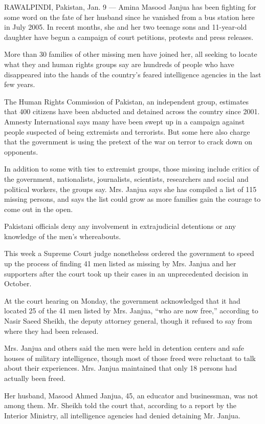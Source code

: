 RAWALPINDI, Pakistan, Jan. 9 --- Amina Masood Janjua has been fighting
for some word on the fate of her husband since he vanished from a bus
station here in July 2005. In recent months, she and her two teenage
sons and 11-year-old daughter have begun a campaign of court petitions,
protests and press releases.

More than 30 families of other missing men have joined her, all seeking
to locate what they and human rights groups say are hundreds of people
who have disappeared into the hands of the country's feared intelligence
agencies in the last few years.

The Human Rights Commission of Pakistan, an independent group, estimates
that 400 citizens have been abducted and detained across the country
since 2001. Amnesty International says many have been swept up in a
campaign against people suspected of being extremists and terrorists.
But some here also charge that the government is using the pretext of
the war on terror to crack down on opponents.

In addition to some with ties to extremist groups, those missing include
critics of the government, nationalists, journalists, scientists,
researchers and social and political workers, the groups say. Mrs.
Janjua says she has compiled a list of 115 missing persons, and says the
list could grow as more families gain the courage to come out in the
open.

Pakistani officials deny any involvement in extrajudicial detentions or
any knowledge of the men's whereabouts.

This week a Supreme Court judge nonetheless ordered the government to
speed up the process of finding 41 men listed as missing by Mrs. Janjua
and her supporters after the court took up their cases in an
unprecedented decision in October.

At the court hearing on Monday, the government acknowledged that it had
located 25 of the 41 men listed by Mrs. Janjua, ``who are now free,''
according to Nasir Saeed Sheikh, the deputy attorney general, though it
refused to say from where they had been released.

Mrs. Janjua and others said the men were held in detention centers and
safe houses of military intelligence, though most of those freed were
reluctant to talk about their experiences. Mrs. Janjua maintained that
only 18 persons had actually been freed.

Her husband, Masood Ahmed Janjua, 45, an educator and businessman, was
not among them. Mr. Sheikh told the court that, according to a report by
the Interior Ministry, all intelligence agencies had denied detaining
Mr. Janjua.

